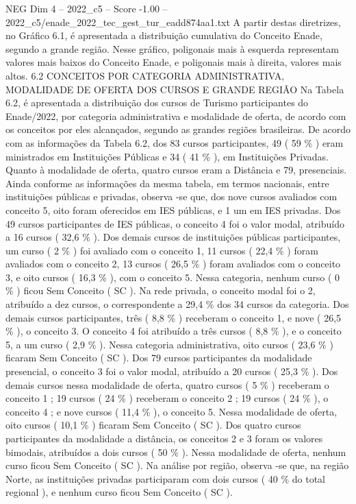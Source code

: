 \begin{textsample}{NEG Dim 4 – 2022\_c5 – Score -1.00 – 2022\_c5/enade\_2022\_tec\_gest\_tur\_eadd874aa1.txt}
A partir destas diretrizes, no Gráfico 6.1, é apresentada a distribuição cumulativa do Conceito Enade, segundo a grande região.
Nesse gráfico, poligonais mais à esquerda representam valores mais baixos do Conceito Enade, e poligonais mais à direita, valores mais altos. 6.2 CONCEITOS POR CATEGORIA ADMINISTRATIVA, MODALIDADE DE OFERTA DOS CURSOS E GRANDE REGIÃO Na Tabela 6.2, é apresentada a distribuição dos cursos de Turismo participantes do Enade/2022, por categoria administrativa e modalidade de oferta, de acordo com os conceitos por eles alcançados, segundo as grandes regiões brasileiras.
De acordo com as informações da Tabela 6.2, dos 83 cursos participantes, 49 ( 59 \% ) eram ministrados em Instituições Públicas e 34 ( 41 \% ), em Instituições Privadas.
Quanto à modalidade de oferta, quatro cursos eram a Distância e 79, presenciais.
Ainda conforme as informações da mesma tabela, em termos nacionais, entre instituições públicas e privadas, observa -se que, dos nove cursos avaliados com conceito 5, oito foram oferecidos em IES públicas, e 1 um em IES privadas.
Dos 49 cursos participantes de IES públicas, o conceito 4 foi o valor modal, atribuído a 16 cursos ( 32,6 \% ).
Dos demais cursos de instituições públicas participantes, um curso ( 2 \% ) foi avaliado com o conceito 1, 11 cursos ( 22,4 \% ) foram avaliados com o conceito 2, 13 cursos ( 26,5 \% ) foram avaliados com o conceito 3, e oito cursos ( 16,3 \% ), com o conceito 5.
Nessa categoria, nenhum curso ( 0 \% ) ficou Sem Conceito ( SC ).
Na rede privada, o conceito modal foi o 2, atribuído a dez cursos, o correspondente a 29,4 \% dos 34 cursos da categoria.
Dos demais cursos participantes, três ( 8,8 \% ) receberam o conceito 1, e nove ( 26,5 \% ), o conceito 3.
O conceito 4 foi atribuído a três cursos ( 8,8 \% ), e o conceito 5, a um curso ( 2,9 \% ).
Nessa categoria administrativa, oito cursos ( 23,6 \% ) ficaram Sem Conceito ( SC ).
Dos 79 cursos participantes da modalidade presencial, o conceito 3 foi o valor modal, atribuído a 20 cursos ( 25,3 \% ).
Dos demais cursos nessa modalidade de oferta, quatro cursos ( 5 \% ) receberam o conceito 1 ; 19 cursos ( 24 \% ) receberam o conceito 2 ; 19 cursos ( 24 \% ), o conceito 4 ; e nove cursos ( 11,4 \% ), o conceito 5.
Nessa modalidade de oferta, oito cursos ( 10,1 \% ) ficaram Sem Conceito ( SC ).
Dos quatro cursos participantes da modalidade a distância, os conceitos 2 e 3 foram os valores bimodais, atribuídos a dois cursos ( 50 \% ).
Nessa modalidade de oferta, nenhum curso ficou Sem Conceito ( SC ).
Na análise por região, observa -se que, na região Norte, as instituições privadas participaram com dois cursos ( 40 \% do total regional ), e nenhum curso ficou Sem Conceito ( SC ).

\end{textsample}
